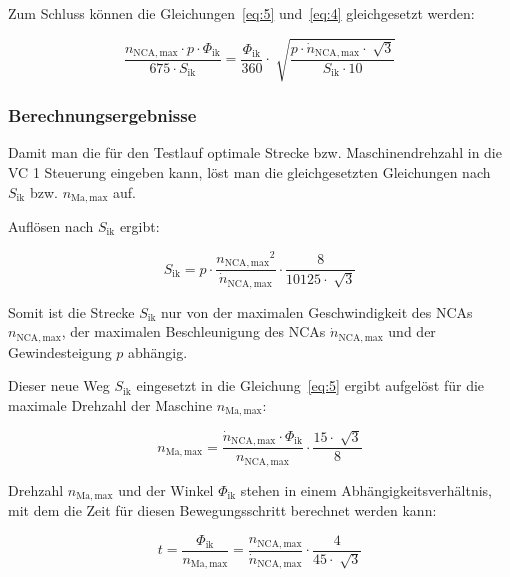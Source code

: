 Zum Schluss können die Gleichungen~\ref{eq:5} und~\ref{eq:4}  gleichgesetzt werden:

\begin{equation}
\frac{n_{\mathrm{NCA, max}} \cdot p \cdot \Phi_{\mathrm{ik}}}   {675 \cdot S_{\mathrm{ik}}} = \frac{\Phi_{\mathrm{ik}}}{360} \cdot \sqrt[]{\frac{p \cdot \dot{n}_{\mathrm{NCA, max}} \cdot \sqrt[]{3}}  {S_{\mathrm{ik}} \cdot 10}}
\end{equation}


\subsubsection{Berechnungsergebnisse}

Damit man die für den Testlauf optimale Strecke bzw. Maschinendrehzahl in die VC 1 Steuerung eingeben kann, löst man die gleichgesetzten Gleichungen nach $S_{\mathrm{ik}}$ bzw. $n_{\mathrm{Ma, max}}$ auf. 


Auflösen nach $S_{\mathrm{ik}}$ ergibt:

\begin{equation}
S_{\mathrm{ik}} = p \cdot \frac{{n_{\mathrm{NCA, max}}}^2}{\dot{n}_{\mathrm{NCA, max}}} \cdot \frac{8}{10125 \cdot \sqrt[]{3}}
\end{equation}


Somit ist die Strecke $S_{\mathrm{ik}}$ nur von der maximalen Geschwindigkeit des NCAs $n_{\mathrm{NCA, max}}$, der maximalen Beschleunigung des NCAs $\dot{n}_{\mathrm{NCA, max}}$ und der Gewindesteigung $p$ abhängig.

Dieser neue Weg $S_{\mathrm{ik}}$ eingesetzt in die Gleichung~\ref{eq:5} ergibt aufgelöst für die maximale Drehzahl der Maschine $n_{\mathrm{Ma, max}}$:


\begin{equation}
n_{\mathrm{Ma, max}} = \frac{\dot{n}_{\mathrm{NCA, max}} \cdot \Phi_{\mathrm{ik}}}{n_{\mathrm{NCA, max}}} \cdot \frac{15 \cdot \sqrt[]{3}}{8}
\end{equation}


Drehzahl $n_{\mathrm{Ma, max}}$ und der Winkel $\Phi_{\mathrm{ik}}$ stehen in einem Abhängigkeitsverhältnis, mit dem die Zeit für diesen Bewegungsschritt berechnet werden kann:

\begin{equation}
t = \frac{\Phi_{\mathrm{ik}}}{n_{\mathrm{Ma, max}}} = \frac{n_{\mathrm{NCA, max}}}{\dot{n}_{\mathrm{NCA, max}}} \cdot \frac{4}{45 \cdot \sqrt[]{3}}
\end{equation}











